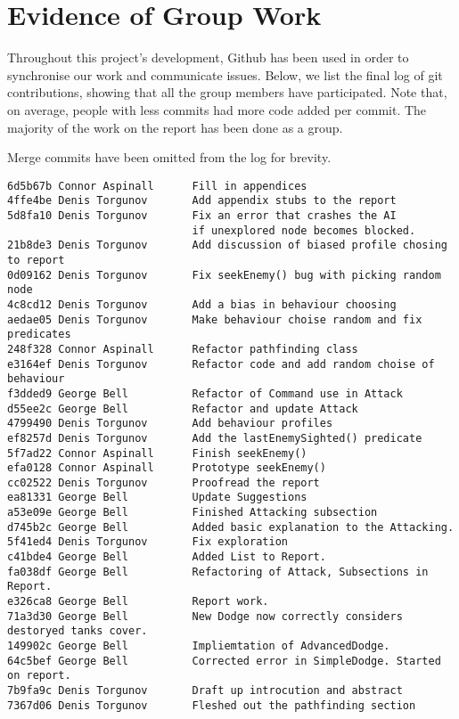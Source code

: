 \documentclass[11pt]{article}
\begin{document}
\newpage
\appendix

\section{Evidence of Group Work}
Throughout this project's development, Github has been used in order to synchronise our work and communicate issues. Below, we list the final log of git contributions, showing that all the group members have participated. Note that, on average, people with less commits had more code added per commit. The majority of the work on the report has been done as a group.

Merge commits have been omitted from the log for brevity.

\begin{verbatim}
6d5b67b Connor Aspinall      Fill in appendices
4ffe4be Denis Torgunov       Add appendix stubs to the report
5d8fa10 Denis Torgunov       Fix an error that crashes the AI
                             if unexplored node becomes blocked.
21b8de3 Denis Torgunov       Add discussion of biased profile chosing to report
0d09162 Denis Torgunov       Fix seekEnemy() bug with picking random node
4c8cd12 Denis Torgunov       Add a bias in behaviour choosing
aedae05 Denis Torgunov       Make behaviour choise random and fix predicates
248f328 Connor Aspinall      Refactor pathfinding class
e3164ef Denis Torgunov       Refactor code and add random choise of behaviour
f3dded9 George Bell          Refactor of Command use in Attack
d55ee2c George Bell          Refactor and update Attack
4799490 Denis Torgunov       Add behaviour profiles
ef8257d Denis Torgunov       Add the lastEnemySighted() predicate
5f7ad22 Connor Aspinall      Finish seekEnemy()
efa0128 Connor Aspinall      Prototype seekEnemy()
cc02522 Denis Torgunov       Proofread the report
ea81331 George Bell          Update Suggestions
a53e09e George Bell          Finished Attacking subsection
d745b2c George Bell          Added basic explanation to the Attacking.
5f41ed4 Denis Torgunov       Fix exploration
c41bde4 George Bell          Added List to Report.
fa038df George Bell          Refactoring of Attack, Subsections in Report.
e326ca8 George Bell          Report work.
71a3d30 George Bell          New Dodge now correctly considers destoryed tanks cover.
149902c George Bell          Impliemtation of AdvancedDodge.
64c5bef George Bell          Corrected error in SimpleDodge. Started on report.
7b9fa9c Denis Torgunov       Draft up introcution and abstract
7367d06 Denis Torgunov       Fleshed out the pathfinding section

\end{verbatim}
\end{document}
